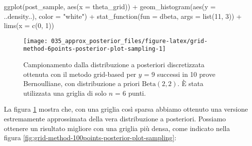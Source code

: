 \documentclass[
]{memoir}
\newenvironment{Shaded}{\begin{snugshade}}{\end{snugshade}}
\newcommand{\AttributeTok}[1]{\textcolor[rgb]{0.77,0.63,0.00}{#1}}
\newcommand{\DecValTok}[1]{\textcolor[rgb]{0.00,0.00,0.81}{#1}}
\newcommand{\FunctionTok}[1]{\textcolor[rgb]{0.00,0.00,0.00}{#1}}
\newcommand{\NormalTok}[1]{#1}
\newcommand{\SpecialCharTok}[1]{\textcolor[rgb]{0.00,0.00,0.00}{#1}}
\newcommand{\StringTok}[1]{\textcolor[rgb]{0.31,0.60,0.02}{#1}}
\begin{document}
\begin{Shaded}
\begin{Highlighting}[]
\FunctionTok{ggplot}\NormalTok{(post\_sample, }\FunctionTok{aes}\NormalTok{(}\AttributeTok{x =}\NormalTok{ theta\_grid)) }\SpecialCharTok{+}
  \FunctionTok{geom\_histogram}\NormalTok{(}\FunctionTok{aes}\NormalTok{(}\AttributeTok{y =}\NormalTok{ ..density..), }\AttributeTok{color =} \StringTok{"white"}\NormalTok{) }\SpecialCharTok{+}
  \FunctionTok{stat\_function}\NormalTok{(}\AttributeTok{fun =}\NormalTok{ dbeta, }\AttributeTok{args =} \FunctionTok{list}\NormalTok{(}\DecValTok{11}\NormalTok{, }\DecValTok{3}\NormalTok{)) }\SpecialCharTok{+}
  \FunctionTok{lims}\NormalTok{(}\AttributeTok{x =} \FunctionTok{c}\NormalTok{(}\DecValTok{0}\NormalTok{, }\DecValTok{1}\NormalTok{))}
\end{Highlighting}
\end{Shaded}

\begin{figure}

{\centering \texttt{[image: 035\_approx\_posterior\_files/figure-latex/grid-method-6points-posterior-plot-sampling-1]} 

}

\caption{Campionamento dalla  distribuzione a posteriori discretizzata ottenuta con il metodo grid-based per $y$ = 9 successi in 10 prove Bernoulliane, con distribuzione a priori $\mbox{Beta}(2, 2)$. È stata utilizzata una griglia di solo $n$ = 6 punti.}\label{fig:grid-method-6points-posterior-plot-sampling}
\end{figure}

\noindent
La figura \ref{fig:grid-method-6points-posterior-plot-sampling} mostra che, con una griglia così sparsa abbiamo ottenuto una versione estremamente approssimata della vera distribuzione a posteriori. Possiamo ottenere un risultato migliore con una griglia più densa, come indicato nella figura \ref{fig:grid-method-100points-posterior-plot-sampling}:
\end{document}

